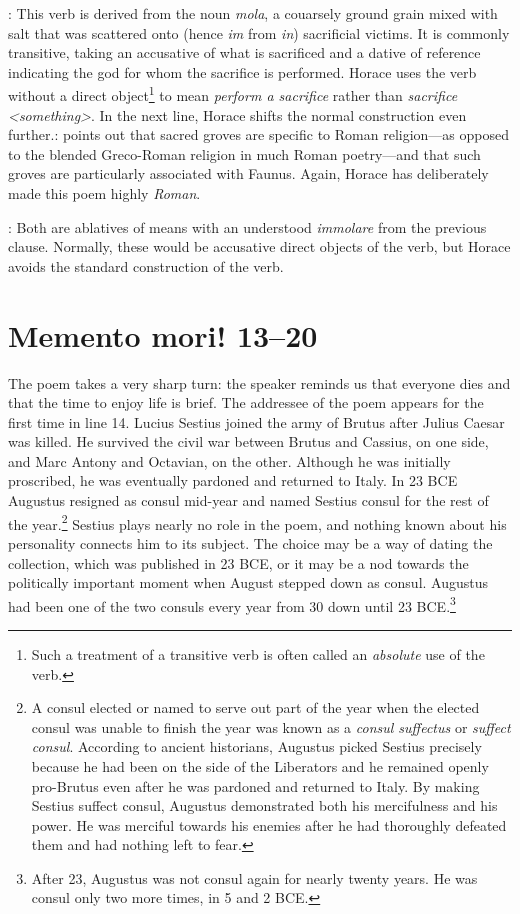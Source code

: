 
: This verb is derived from the noun \textit{mola}, a couarsely ground grain mixed with salt that was scattered onto (hence \textit{im} from \textit{in}) sacrificial victims.  It is commonly transitive, taking an accusative of what is sacrificed and a dative of reference indicating the god for whom the sacrifice is performed.  Horace uses the verb without a direct object\footnote{Such a treatment of a transitive verb is often called an \textit{absolute} use of the verb.} to mean \textit{perform a sacrifice} rather than \textit{sacrifice <something>}.  In the next line, Horace shifts the normal construction even further.\indent{}: \citet[82]{mayer2012} points out that sacred groves are specific  to Roman religion---as opposed to  the blended Greco-Roman religion in much Roman poetry---and that such groves are particularly associated with Faunus.  Again, Horace has deliberately made this poem highly \textit{Roman}.

: Both are ablatives of means with an understood \textit{immolare} from the previous clause.  Normally, these would be accusative direct objects of the verb, but Horace avoids the standard construction of the verb.

\section*{Memento mori! 13--20}

The poem takes a very sharp turn: the speaker reminds us that everyone dies and that the time to enjoy life is brief.  The addressee of the poem appears for the first time in line 14.  Lucius Sestius joined the army of Brutus after Julius Caesar was killed.  He survived the civil war between Brutus and Cassius, on one side, and Marc Antony and Octavian, on the other.  Although he was initially proscribed, he was eventually pardoned and returned to Italy.  In 23 BCE Augustus resigned as consul mid-year and named Sestius consul for the rest of the year.\footnote{A consul elected or named to serve out part of the year when the elected consul was unable to finish the year was known as a \textit{consul suffectus} or \textit{suffect consul}.  According to ancient historians, Augustus picked Sestius precisely because he had been on the side of the Liberators and he remained openly pro-Brutus even after he was pardoned and returned to Italy.  By making Sestius suffect consul, Augustus demonstrated both his mercifulness and his power.  He was merciful towards his enemies after he had thoroughly defeated them and had nothing left to fear.}  Sestius plays nearly no role in the poem, and nothing known about his personality connects him to its subject.  The choice may be a way of dating the collection, which was published in 23 BCE, or it may be a nod towards the politically important moment when August stepped down as consul.  Augustus had been one of the two consuls every year from 30 down until 23 BCE.\footnote{After 23, Augustus was not consul again for nearly twenty years.  He was consul only two more times, in 5 and 2 BCE.}

